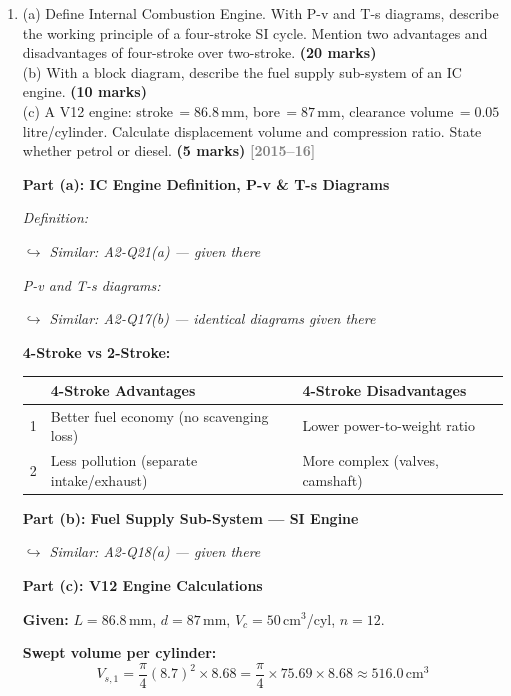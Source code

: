 \documentclass[12pt,a3paper]{article}
\newcommand{\yr}[1]{\hfill\textcolor{gray}{\small\textbf{[#1]}}}
\newcommand{\mk}[1]{\textcolor{orange!70!black}{\small\textbf{(#1 marks)}}}
\newcommand{\variant}[1]{\par\vspace{1pt}\textcolor{blue!50!black}%
  {\footnotesize\textit{$\hookrightarrow$ Similar: #1}}}
\begin{document}
\begin{enumerate}
\item \label{qlabel:A2-Q22}
(a) Define Internal Combustion Engine. With P-v and T-s diagrams, describe the working principle of a four-stroke SI cycle. Mention two advantages and disadvantages of four-stroke over two-stroke. \mk{20}\\
(b) With a block diagram, describe the fuel supply sub-system of an IC engine. \mk{10}\\
(c) A V12 engine: stroke\,$= 86.8$\,mm, bore\,$= 87$\,mm, clearance volume\,$= 0.05$\,litre/cylinder. Calculate displacement volume and compression ratio. State whether petrol or diesel. \mk{5}
\yr{2015--16}

\begin{tcolorbox}[enhanced,breakable,ansbox,colback=cB!4,colframe=cB,
  boxrule=0.8pt,arc=5pt,
  title={\textbf{Answer}},fonttitle=\bfseries\color{white},colbacktitle=cB]

\textbf{Part (a): IC Engine Definition, P-v \& T-s Diagrams}

\textit{Definition:} \variant{A2-Q21(a) — given there}

\textit{P-v and T-s diagrams:} \variant{A2-Q17(b) — identical diagrams given there}

\textbf{4-Stroke vs 2-Stroke:}

\begin{center}
\small
\begin{tabular}{@{}lll@{}}
\toprule
& \textbf{4-Stroke Advantages}               & \textbf{4-Stroke Disadvantages} \\
\midrule
1 & Better fuel economy (no scavenging loss)   & Lower power-to-weight ratio \\
2 & Less pollution (separate intake/exhaust)   & More complex (valves, camshaft) \\
\bottomrule
\end{tabular}
\end{center}

\hrulefill

\textbf{Part (b): Fuel Supply Sub-System — SI Engine}
\variant{A2-Q18(a) — given there}
\hrulefill

\textbf{Part (c): V12 Engine Calculations}

\textbf{Given:} $L=86.8$\,mm, $d=87$\,mm, $V_c=50$\,cm$^3$/cyl, $n=12$.

\textbf{Swept volume per cylinder:}
\[
  V_{s,1} = \frac{\pi}{4}(8.7)^2\times8.68
  = \frac{\pi}{4}\times75.69\times8.68
  \approx \boxed{516.0\,\text{cm}^3}
\]


\end{tcolorbox}
\end{enumerate}
\end{document}

